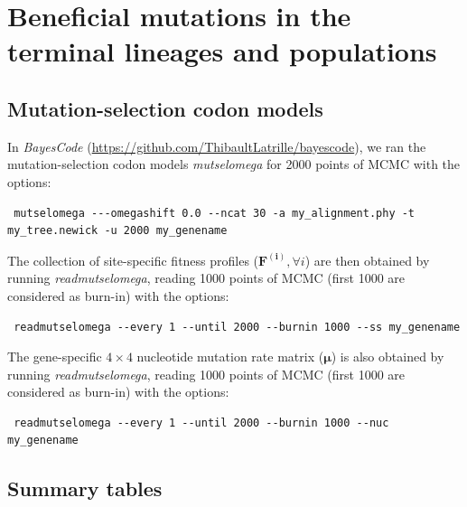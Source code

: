 \documentclass[12pt]{article}
\newcommand{\UniDimArray}[1]{\bm{#1}}
\begin{document}
\section{Beneficial mutations in the terminal lineages and populations}\label{sec:beneficial-mutations}

    \subsection{Mutation-selection codon models}
    \label{sec:site-specific-mutation-selection-codon-models}
    In \textit{BayesCode} (\url{https://github.com/ThibaultLatrille/bayescode}), we ran the mutation-selection codon models \textit{mutselomega} for 2000 points of MCMC with the options:
    \begin{scriptsize}
        \begin{verbatim}
 mutselomega ---omegashift 0.0 --ncat 30 -a my_alignment.phy -t my_tree.newick -u 2000 my_genename
        \end{verbatim}
    \end{scriptsize}
    The collection of site-specific fitness profiles ($\UniDimArray{F^{(i)}}, \forall i$) are then obtained by running \textit{readmutselomega}, reading 1000 points of MCMC (first 1000 are considered as burn-in) with the options:
    \begin{scriptsize}
        \begin{verbatim}
 readmutselomega --every 1 --until 2000 --burnin 1000 --ss my_genename
        \end{verbatim}
    \end{scriptsize}
    The gene-specific $4 \times 4$ nucleotide mutation rate matrix ($\UniDimArray{\mu}$) is also obtained by running \textit{readmutselomega}, reading 1000 points of MCMC (first 1000 are considered as burn-in) with the options:
    \begin{scriptsize}
        \begin{verbatim}
 readmutselomega --every 1 --until 2000 --burnin 1000 --nuc my_genename
        \end{verbatim}
    \end{scriptsize}

    \subsection{Summary tables}\label{subsec:summary-table-mutsel}
\end{document}
